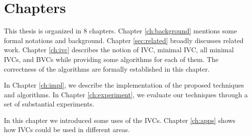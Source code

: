 %
%
%


\section{Chapters}
This thesis is organized in 8 chapters. Chapter \ref{ch:background} mentions some formal notations and background. Chapter \ref{sec:related} broadly discusses related work. Chapter \ref{ch:ivc} describes the notion of IVC, minimal IVC, all minimal IVCs, and BVCs while providing some algorithms for each of them. The correctness of the algorithms are formally established in this chapter.

In Chapter \ref{ch:impl}, we describe the implementation of the proposed techniques and algorithms.  In Chapter \ref{ch:experiment}, we evaluate our techniques through a set of substantial experiments.

In this chapter we introduced some uses of the IVCs. Chapter \ref{ch:apps} shows how IVCs could be used in different areas.

